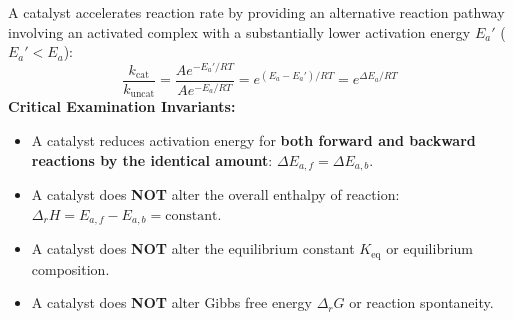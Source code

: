 \documentclass[10pt,a4paper]{article}
\begin{document}
\begin{conceptbox}
A catalyst accelerates reaction rate by providing an alternative reaction pathway involving an activated complex with a substantially lower activation energy $E_a'$ ($E_a' < E_a$):
\begin{equation}
  \frac{k_{\text{cat}}}{k_{\text{uncat}}} = \frac{A e^{-E_a' / R T}}{A e^{-E_a / R T}} = e^{(E_a - E_a') / R T} = e^{\Delta E_a / R T}
\end{equation}
\textbf{Critical Examination Invariants:}
\begin{itemize}
  \item A catalyst reduces activation energy for \textbf{both forward and backward reactions by the identical amount}: $\Delta E_{a,f} = \Delta E_{a,b}$.
  \item A catalyst does \textbf{NOT} alter the overall enthalpy of reaction: $\Delta_r H = E_{a,f} - E_{a,b} = \text{constant}$.
  \item A catalyst does \textbf{NOT} alter the equilibrium constant $K_{\text{eq}}$ or equilibrium composition.
  \item A catalyst does \textbf{NOT} alter Gibbs free energy $\Delta_r G$ or reaction spontaneity.
\end{itemize}
\end{conceptbox}
\end{document}

